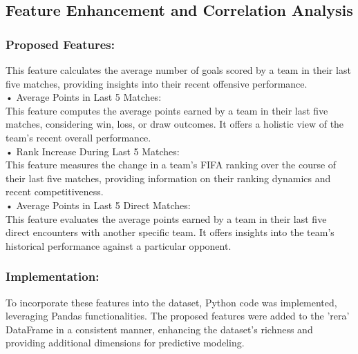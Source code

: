 \documentclass[letterpaper]{article}
\begin{document}
	\subsection*{Feature Enhancement and Correlation Analysis }
	
		\subsubsection*{	Proposed Features:}
		This feature calculates the average number of goals scored by a team in their last five matches, providing insights into their recent offensive performance.\\
		
		•	Average Points in Last 5 Matches:\\
		This feature computes the average points earned by a team in their last five matches, considering win, loss, or draw outcomes. It offers a holistic view of the team's recent overall performance.\\
		
		•	Rank Increase During Last 5 Matches:\\
		This feature measures the change in a team's FIFA ranking over the course of their last five matches, providing information on their ranking dynamics and recent competitiveness.\\
		
		•	Average Points in Last 5 Direct Matches:\\
		This feature evaluates the average points earned by a team in their last five direct encounters with another specific team. It offers insights into the team's historical performance against a particular opponent.\\

		\subsubsection*{	Implementation:}
		To incorporate these features into the dataset, Python code was implemented, leveraging Pandas functionalities. The proposed features were added to the 'rera' DataFrame in a consistent manner, enhancing the dataset's richness and providing additional dimensions for predictive modeling.\newpage
\end{document}
